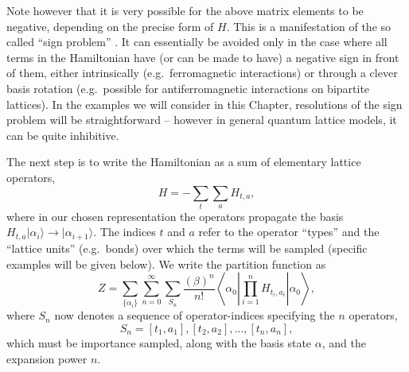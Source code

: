 \documentclass[vecphys]{svmult}
\begin{document}
Note however that it is very possible for the above matrix elements to be negative, depending on the precise form of $H$.
This is a manifestation of the so called ``sign problem'' \cite{Melko:Henelius00}.  It can 
essentially be avoided only in the case where all terms in the Hamiltonian have (or can be made to have) a negative sign in front of them, 
either intrinsically (e.g.~ferromagnetic interactions) or through a clever basis rotation (e.g.~possible for antiferromagnetic interactions on bipartite lattices).  In the examples we will consider in this Chapter, resolutions of the sign problem will be straightforward -- however in general quantum lattice models, it can be quite inhibitive.

The next step is to write the Hamiltonian as a sum of elementary lattice operators,
\begin{equation}
H=-\sum_t \sum_a H_{t,a}, \label{Hdecomp}
\label{Hsum}
\end{equation}
where in our chosen representation the operators propagate the basis $H_{t,a} |\alpha_i \rangle \rightarrow | \alpha_{i+1} \rangle$.  The indices $t$ and $a$ refer to the operator ``types'' and the ``lattice units'' (e.g.~bonds) over which the terms will be sampled (specific examples will be given below).  We write the partition function as
\begin{equation}
Z=\sum_{ \{ \alpha_i \} } \sum_{n=0}^{\infty} \sum_{S_n} \frac{ (\beta)^n}{n !}
 \left\langle{\alpha_0  \left|  \prod_{i=1}^{n} {H_{t_i,a_i}} \right| \alpha_0   }\right\rangle,
 \label{Zsse2b}
\end{equation}
where $S_n$ now denotes a sequence of operator-indices specifying the $n$ operators,
\begin{equation}
S_n = [t_1,a_1],[t_2,a_2], \ldots ,[t_n,a_n],
\end{equation}
which must be importance sampled, along with the basis state $\alpha$, and the expansion power $n$.   
\end{document}
